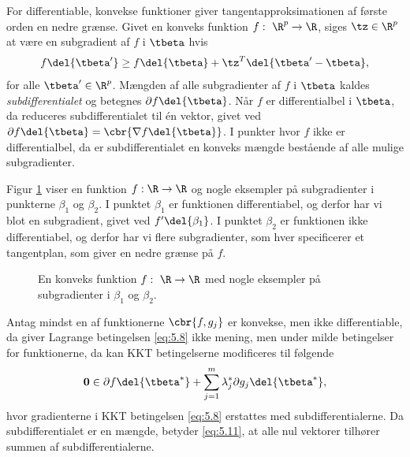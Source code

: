 For differentiable, konvekse funktioner giver tangentapproksimationen af første orden en nedre grænse.
Givet en konveks funktion \(f: \ \R^p \rightarrow \R\), siges \(\tz \in \R^p\) at være en subgradient af \(f\) i \(\tbeta\) hvis
\begin{align*}
f \del{\tbeta'} \geq f \del{\tbeta} + \tz^T \del{ \tbeta' - \tbeta}, 
\end{align*}
for alle \(\tbeta' \in \R^p\).
Mængden af alle subgradienter af \(f\) i \(\tbeta\) kaldes \textit{subdifferentialet} og betegnes \(\partial f \del{\tbeta}\).
Når \(f\) er differentialbel i \(\tbeta\), da reduceres subdifferentialet til én vektor, givet ved \(\partial f \del{\tbeta} = \cbr{\nabla f \del{\tbeta}}\).
I punkter hvor \(f\) ikke er differentialbel, da er subdifferentialet en konveks mængde bestående af alle mulige subgradienter.

Figur \ref{fig:subgradients} viser en funktion \(f : \R \rightarrow \R\) og nogle eksempler på subgradienter i punkterne \(\beta_1\) og \(\beta_2\).
I punktet \(\beta_1\) er funktionen differentiabel, og derfor har vi blot en subgradient, givet ved \(f' \del{\beta_1}\). I punktet \(\beta_2\) er funktionen ikke differentiabel, og derfor har vi flere subgradienter, som hver specificerer et tangentplan, som giver en nedre grænse på \(f\).
%
\begin{figure}[H]
\centering
\scalebox{1.2}{}
\caption{En konveks funktion \(f : \ \R \rightarrow \R\) med nogle eksempler på subgradienter i \(\beta_1\) og \(\beta_2\).} \label{fig:subgradients}
\end{figure}
%
Antag mindst en af funktionerne \(\cbr{f, g_j}\) er konvekse, men ikke differentiable, da giver Lagrange betingelsen \eqref{eq:5.8} ikke mening, men under milde betingelser for funktionerne, da kan KKT betingelserne modificeres til følgende
\begin{align}
\mathbf{0} \in \partial f \del{\tbeta^*} + \sum_{j=1}^m \lambda_j^* \partial g_j \del{\tbeta^*}, \label{eq:5.11}
\end{align}
hvor gradienterne i KKT betingelsen \eqref{eq:5.8} erstattes med subdifferentialerne.
Da subdifferentialet er en mængde, betyder \eqref{eq:5.11}, at alle nul vektorer tilhører summen af subdifferentialerne.

